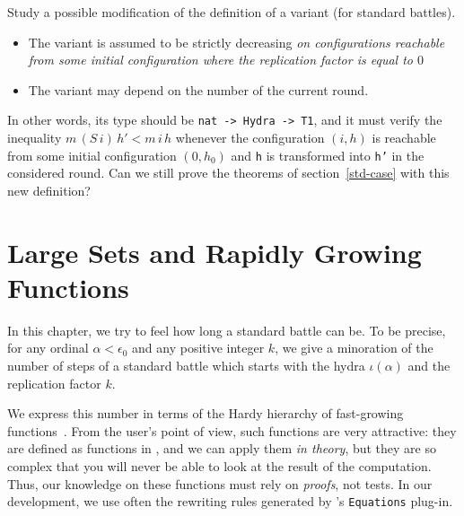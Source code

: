 \begin{project}
Study a possible modification of the definition of a variant  (for  standard battles).

\begin{itemize}
\item The variant is assumed to be strictly decreasing \emph{on configurations 
reachable from some initial configuration where the replication factor is equal to $0$}
\item The variant may depend on the number of the current round.
\end{itemize}

In other words, its type should be \texttt{nat -> Hydra -> T1}, and it must 
verify the inequality $m\, (S\,i)\, h' < m\,i\, h$ whenever the configuration 
$(i,h)$ is reachable from some initial configuration $(0,h_0)$
and \texttt{h} is transformed into \texttt{h'} in the considered round.
Can we still prove the theorems of section~\ref{std-case} with this new definition?

\end{project}



\chapter{Large Sets and Rapidly Growing Functions}\label{chap:alpha-large}



In this chapter, we try to feel how long a standard battle can be.
To be precise, for any ordinal $\alpha<\epsilon_0$ and any positive integer $k$,
we give a minoration of the number of steps of a standard battle which
starts with the hydra $\iota(\alpha)$ and the replication factor $k$.

We express this number in terms of the Hardy hierarchy of fast-growing 
functions~\cite{BW85, Wainer1970, KS81, Promel2013}.
 From the \coq{} user's point of view, such  functions are  very 
attractive:  they are defined as functions  in \gallina{}, and we can apply them \emph{in theory}, but they are so complex that you will never be able to look at the result of the computation.
 Thus, our knowledge on these functions must rely on \emph{proofs}, not tests. In our development, we use often the rewriting rules generated by \coq's \texttt{Equations} plug-in.


